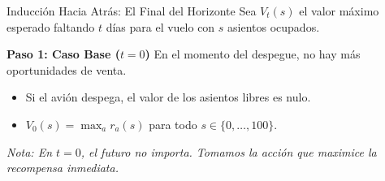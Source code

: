 \documentclass[xcolor=dvipsnames]{beamer}
\begin{document}
\begin{frame}{Inducción Hacia Atrás: El Final del Horizonte}
Sea $V_t(s)$ el valor máximo esperado faltando $t$ días para el vuelo con $s$ asientos ocupados.

\textbf{Paso 1: Caso Base ($t=0$)}
En el momento del despegue, no hay más oportunidades de venta.

\begin{itemize}
    \item Si el avión despega, el valor de los asientos libres es nulo.
    \item $V_0(s) = \max_a r_a(s)$ para todo $s \in \{0, \dots, 100\}$.
\end{itemize}

\begin{center}
\end{center}

\textit{Nota: En $t=0$, el futuro no importa. Tomamos la acci\'on que maximice la recompensa inmediata.}
\end{frame}
\end{document}
